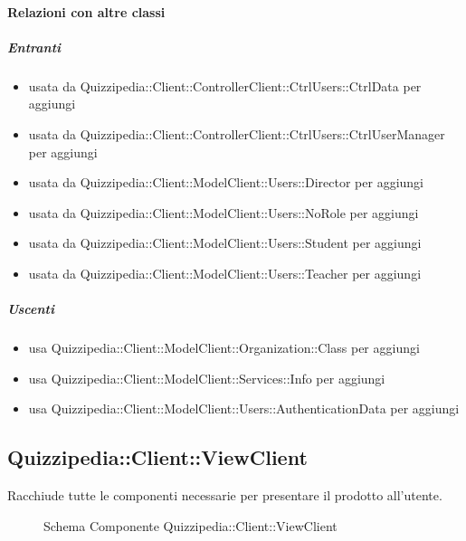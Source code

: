 \paragraph{Relazioni con altre classi}
\subparagraph{Entranti}
\begin{itemize}
\item usata da Quizzipedia::Client::ControllerClient::CtrlUsers::CtrlData per aggiungi
\item usata da Quizzipedia::Client::ControllerClient::CtrlUsers::CtrlUserManager per aggiungi
\item usata da Quizzipedia::Client::ModelClient::Users::Director per aggiungi
\item usata da Quizzipedia::Client::ModelClient::Users::NoRole per aggiungi
\item usata da Quizzipedia::Client::ModelClient::Users::Student per aggiungi
\item usata da Quizzipedia::Client::ModelClient::Users::Teacher per aggiungi
\end{itemize}
\subparagraph{Uscenti}
\begin{itemize}
\item usa Quizzipedia::Client::ModelClient::Organization::Class per aggiungi
\item usa Quizzipedia::Client::ModelClient::Services::Info per aggiungi
\item usa Quizzipedia::Client::ModelClient::Users::AuthenticationData per aggiungi
\end{itemize}
\subsection{Quizzipedia::Client::ViewClient}
Racchiude tutte le componenti necessarie per presentare il prodotto all'utente.
\begin{figure}[H]
\centering
\noindent{}
\caption[Schema Componente Quizzipedia::Client::ViewClient]{Schema Componente Quizzipedia::Client::ViewClient}
\end{figure}
